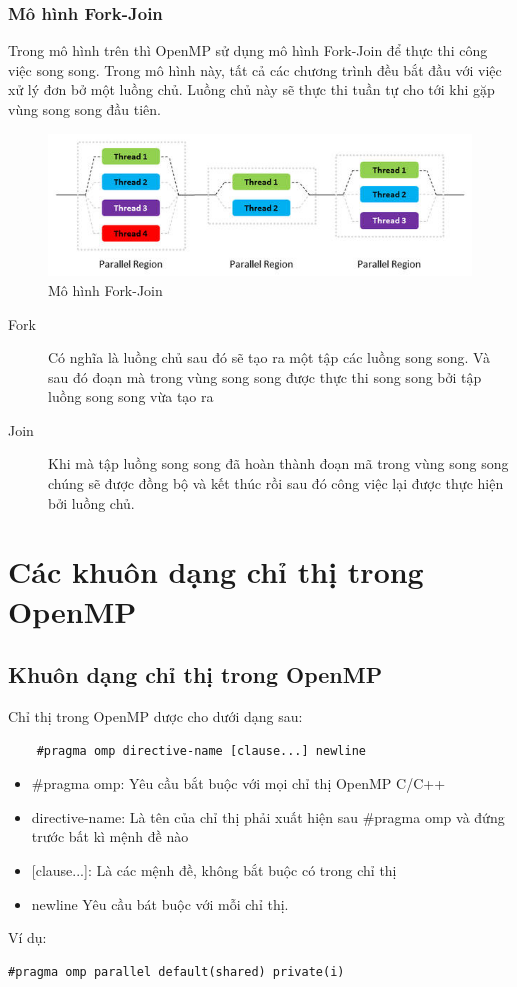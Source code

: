 \documentclass{report}
\begin{document}
\subsubsection{Mô hình Fork-Join}
Trong mô hình trên thì OpenMP sử dụng mô hình Fork-Join để thực thi công việc song song. Trong mô hình này, tất cả các chương trình đều bắt đầu với việc xử lý đơn bở một luồng chủ. Luồng chủ này sẽ thực thi tuần tự cho tới khi gặp vùng song song đầu tiên.
\begin{figure}[htb]
   \centering
   \includegraphics[scale=0.5]{img/pic1.jpg}
   \caption{Mô hình Fork-Join}
   \label{fig:pic_fork_join}
\end{figure}

\begin{description}
\item [Fork] Có nghĩa là luồng chủ sau đó sẽ tạo ra một tập các luồng song song. Và sau đó đoạn mà trong vùng song song được thực thi song song bởi tập luồng song song vừa tạo ra 
\item [Join] Khi mà tập luồng song song đã hoàn thành đoạn mã trong vùng song song chúng sẽ được đồng bộ và kết thúc rồi sau đó công việc lại được thực hiện bởi luồng chủ.
\end{description}


\section{Các khuôn dạng chỉ thị trong OpenMP}
\subsection{Khuôn dạng chỉ thị trong OpenMP}
Chỉ thị trong OpenMP dược cho dưới dạng sau:
\begin{verbatim}
	#pragma omp directive-name [clause...] newline
\end{verbatim}

\begin{itemize}
\item \textsf{\#pragma omp}: Yêu cầu bắt buộc với mọi chỉ thị OpenMP C/C++
\item \textsf{directive-name}: Là tên của chỉ thị phải xuất hiện sau \textsf{\#pragma omp} và đứng trước bất kì mệnh đề nào
\item \textsf{[clause...]}: Là các mệnh đề, không bắt buộc có trong chỉ thị
\item \textsf{newline} Yêu cầu bát buộc với mỗi chỉ thị.
\end{itemize}
Ví dụ:
\begin{verbatim}
#pragma omp parallel default(shared) private(i)
\end{verbatim}
\end{document}
